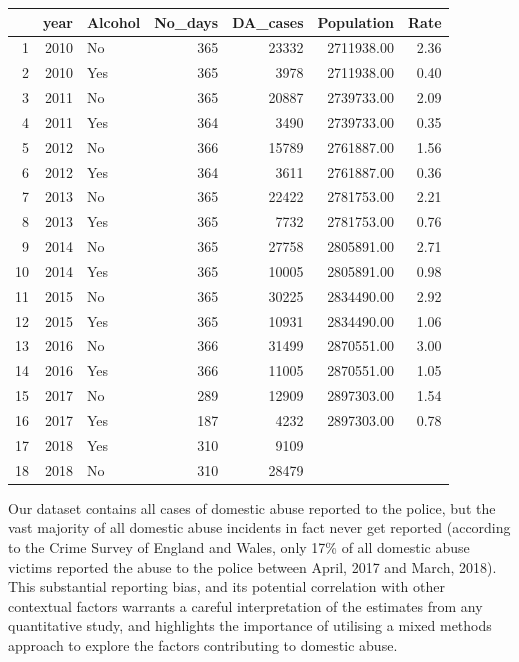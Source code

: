 \documentclass[12pt, letterpaper]{article}
\begin{document}
\begin{table}[ht]
\centering
\begin{tabular}{rrlrrrr}
  \hline
 & year & Alcohol & No\_days & DA\_cases & Population & Rate \\ 
  \hline
1 & 2010 & No & 365 & 23332 & 2711938.00 & 2.36 \\ 
  2 & 2010 & Yes & 365 & 3978 & 2711938.00 & 0.40 \\ 
  3 & 2011 & No & 365 & 20887 & 2739733.00 & 2.09 \\ 
  4 & 2011 & Yes & 364 & 3490 & 2739733.00 & 0.35 \\ 
  5 & 2012 & No & 366 & 15789 & 2761887.00 & 1.56 \\ 
  6 & 2012 & Yes & 364 & 3611 & 2761887.00 & 0.36 \\ 
  7 & 2013 & No & 365 & 22422 & 2781753.00 & 2.21 \\ 
  8 & 2013 & Yes & 365 & 7732 & 2781753.00 & 0.76 \\ 
  9 & 2014 & No & 365 & 27758 & 2805891.00 & 2.71 \\ 
  10 & 2014 & Yes & 365 & 10005 & 2805891.00 & 0.98 \\ 
  11 & 2015 & No & 365 & 30225 & 2834490.00 & 2.92 \\ 
  12 & 2015 & Yes & 365 & 10931 & 2834490.00 & 1.06 \\ 
  13 & 2016 & No & 366 & 31499 & 2870551.00 & 3.00 \\ 
  14 & 2016 & Yes & 366 & 11005 & 2870551.00 & 1.05 \\ 
  15 & 2017 & No & 289 & 12909 & 2897303.00 & 1.54 \\ 
  16 & 2017 & Yes & 187 & 4232 & 2897303.00 & 0.78 \\ 
  17 & 2018 & Yes & 310 & 9109 &  &  \\ 
  18 & 2018 & No & 310 & 28479 &  &  \\ 
   \hline
\end{tabular}
\end{table}

Our dataset contains all cases of domestic abuse reported to the police, but the vast majority of all domestic abuse incidents in fact never get reported (according to the Crime Survey of England and Wales, only 17\% of all domestic abuse victims reported the abuse to the police between April, 2017 and March, 2018\autocite{ONS}). This substantial reporting bias, and its potential correlation with other contextual factors warrants a careful interpretation of the estimates from any quantitative study, and highlights the importance of utilising a mixed methods approach to explore the factors contributing to domestic abuse. 
\end{document}
